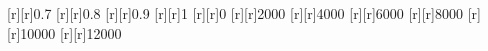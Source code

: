 \begin{psfrags}
[r][r]{0.7}%
[r][r]{0.8}%
[r][r]{0.9}%
[r][r]{1}%
[r][r]{0}%
[r][r]{2000}%
[r][r]{4000}%
[r][r]{6000}%
[r][r]{8000}%
[r][r]{10000}%
[r][r]{12000}%
%
%
\end{psfrags}%
%
